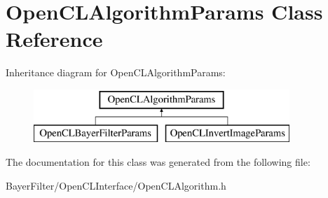 \hypertarget{class_open_c_l_algorithm_params}{\section{Open\-C\-L\-Algorithm\-Params Class Reference}
\label{class_open_c_l_algorithm_params}
}
Inheritance diagram for Open\-C\-L\-Algorithm\-Params\-:\begin{figure}[H]
\begin{center}
\leavevmode
\includegraphics[height=2.000000cm]{class_open_c_l_algorithm_params}
\end{center}
\end{figure}


The documentation for this class was generated from the following file\-:\begin{DoxyCompactItemize}
\item 
Bayer\-Filter/\-Open\-C\-L\-Interface/Open\-C\-L\-Algorithm.\-h\end{DoxyCompactItemize}
